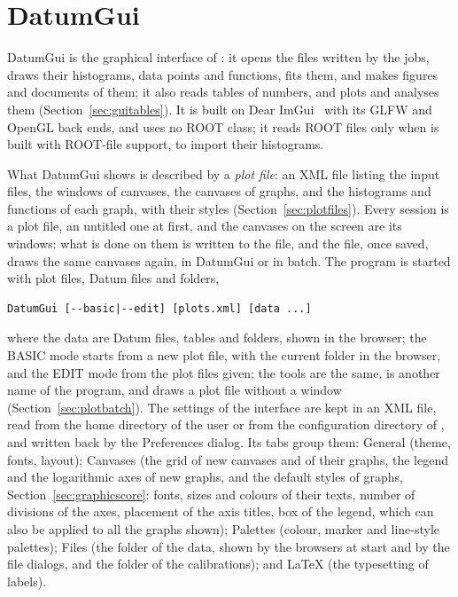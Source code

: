 \section{DatumGui}
\label{sec:capgui}

DatumGui is the graphical interface of \Datum{}: it opens the files written by the jobs, draws their histograms, data
points and functions, fits them, and makes figures and documents of them; it also reads tables of numbers, and plots
and analyses them (Section~\ref{sec:guitables}). It is built on Dear ImGui~\cite{DearImGui}
with its GLFW and OpenGL back ends, and uses no ROOT class; it reads ROOT files only when \Datum{} is built with
ROOT-file support, to import their histograms.

What DatumGui shows is described by a \emph{plot file}: an XML file listing the input files, the windows of canvases,
the canvases of graphs, and the histograms and functions of each graph, with their styles
(Section~\ref{sec:plotfiles}). Every session is a plot file, an untitled one at first, and the canvases on the screen
are its windows: what is done on them is written to the file, and the file, once saved, draws the same canvases again,
in DatumGui or in batch. The program is started with plot files, Datum files and folders,
{\footnotesize
\begin{verbatim}
DatumGui [--basic|--edit] [plots.xml] [data ...]
\end{verbatim}}
\noindent where the data are Datum files, tables and folders, shown in the browser; the BASIC mode starts from a new plot file,
with the current folder in the browser, and the EDIT mode from the plot files given; the tools are the same.  is another name of the program, and
 draws a plot file without a window (Section~\ref{sec:plotbatch}). The settings of the interface
are kept in an XML file, read from the home directory of the user or from the configuration directory of \Datum{},
and written back by the Preferences dialog. Its tabs group them: General (theme, fonts, layout); Canvases (the grid
of new canvases and of their graphs, the legend and the logarithmic axes of new graphs, and the default styles of
graphs, Section~\ref{sec:graphicscore}: fonts, sizes and colours of their texts, number of divisions of the axes,
placement of the axis titles, box of the legend, which can also be applied to all the graphs shown); Palettes
(colour, marker and line-style palettes); Files (the folder of the data, shown by the browsers at start and by the
file dialogs, and the folder of the calibrations); and \LaTeX{} (the typesetting of labels).

